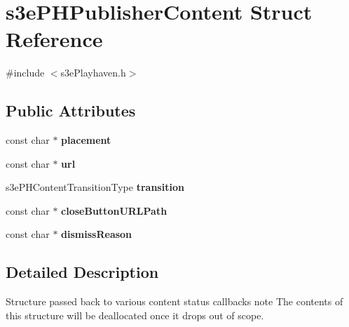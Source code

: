 \hypertarget{structs3e_p_h_publisher_content}{\section{s3e\-P\-H\-Publisher\-Content Struct Reference}
\label{structs3e_p_h_publisher_content}
}


{\ttfamily \#include $<$s3e\-Playhaven.\-h$>$}

\subsection*{Public Attributes}
\begin{DoxyCompactItemize}
\item 
\hypertarget{structs3e_p_h_publisher_content_a5b157d1356278cfa8cc580333bef74a2}{const char $\ast$ {\bfseries placement}}\label{structs3e_p_h_publisher_content_a5b157d1356278cfa8cc580333bef74a2}

\item 
\hypertarget{structs3e_p_h_publisher_content_affbc30429560f0c2fa8e66f6f2d0cdf0}{const char $\ast$ {\bfseries url}}\label{structs3e_p_h_publisher_content_affbc30429560f0c2fa8e66f6f2d0cdf0}

\item 
\hypertarget{structs3e_p_h_publisher_content_a0708d46316d1fc997d7c2ad40540b97c}{s3e\-P\-H\-Content\-Transition\-Type {\bfseries transition}}\label{structs3e_p_h_publisher_content_a0708d46316d1fc997d7c2ad40540b97c}

\item 
\hypertarget{structs3e_p_h_publisher_content_ac79cea580ad0bd4cbb8e17974aeed4ca}{const char $\ast$ {\bfseries close\-Button\-U\-R\-L\-Path}}\label{structs3e_p_h_publisher_content_ac79cea580ad0bd4cbb8e17974aeed4ca}

\item 
\hypertarget{structs3e_p_h_publisher_content_a34cc7c6413a4b4f27a0f16e138a7e773}{const char $\ast$ {\bfseries dismiss\-Reason}}\label{structs3e_p_h_publisher_content_a34cc7c6413a4b4f27a0f16e138a7e773}

\end{DoxyCompactItemize}


\subsection{Detailed Description}
Structure passed back to various content status callbacks note The contents of this structure will be deallocated once it drops out of scope.


